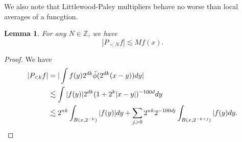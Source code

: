 \documentclass[11pt]{article}
\newtheorem{lem}[thm]{Lemma}
\theoremstyle{remark}
\newcommand{\1}{\textbf{1}}
\newcommand{\lle}{\lesssim}
\newcommand{\bbZ}{\mathbb{Z}}
\begin{document}
\noindent We also note that Littlewood-Paley multipliers behave no worse than local averages of a funcgtion.

\begin{lem}
For any $N \in \bbZ$, we have
\[
|P_{< N} f| \lle Mf(x).
\]
\end{lem}
\begin{proof}
We have
\begin{align*}
|P_{< k} f|  &= |\int f(y) 2^{dk} \check{\phi}(2^{dk}(x-y)) dy|\\
& \lle \int |f(y)| 2^{dk}(1 + 2^k|x-y|)^{-100d} dy \\
& \lle 2^{nk} \int_{B(x, 2^{-k})}|f(y)| dy + \sum_{j > 0} 2^{nk} 2^{-100dj} \int_{B(x,2^{-k+j})}|f(y) dy. \qedhere
\end{align*}
\end{proof}
\end{document}
